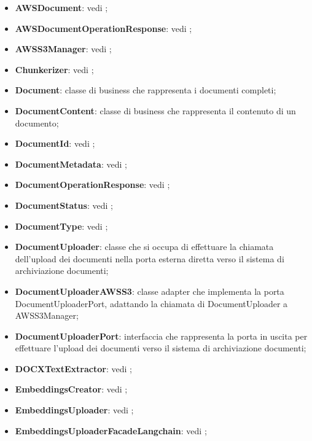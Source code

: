 \documentclass[10pt, a4paper]{article}
\begin{document}
\begin{itemize}
    \item \textbf{AWSDocument}: vedi ;
    \item \textbf{AWSDocumentOperationResponse}: vedi ;
    \item \textbf{AWSS3Manager}: vedi ;
    \item \textbf{Chunkerizer}: vedi ;
    \item \label{Document}\textbf{Document}: classe di business che rappresenta i documenti completi;
    \item \label{DocumentContent}\textbf{DocumentContent}: classe di business che rappresenta il contenuto di un documento;
    \item \textbf{DocumentId}: vedi ;    
    \item \textbf{DocumentMetadata}: vedi ;
    \item \textbf{DocumentOperationResponse}: vedi ;
    \item \textbf{DocumentStatus}: vedi ;
    \item \textbf{DocumentType}: vedi ;
    \item \label{DocumentsUploader}\textbf{DocumentUploader}: classe che si occupa di effettuare la chiamata dell'upload dei documenti nella porta esterna diretta verso il sistema di archiviazione documenti;
    \item \label{DocumentsUploaderAWSS3}\textbf{DocumentUploaderAWSS3}: classe adapter che implementa la porta DocumentUploaderPort, adattando la chiamata di DocumentUploader a AWSS3Manager;
    \item \label{DocumentsUploaderPort}\textbf{DocumentUploaderPort}: interfaccia che rappresenta la porta in uscita per effettuare l'upload dei documenti verso il sistema di archiviazione documenti;
    \item \textbf{DOCXTextExtractor}: vedi ;
    \item \textbf{EmbeddingsCreator}: vedi ;
    \item \textbf{EmbeddingsUploader}: vedi ;
    \item \textbf{EmbeddingsUploaderFacadeLangchain}: vedi ;

\end{itemize}
\end{document}
